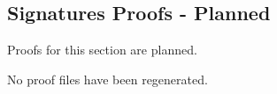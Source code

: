 \subsection*{Signatures Proofs - Planned}

Proofs for this section are planned.

No proof files have been regenerated.
